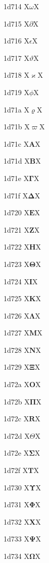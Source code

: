 \documentclass[11pt]{article}
\begin{document}
1d714 X{\ensuremath{\mathit{\omega}}}X

1d715 X{\ensuremath{\mathit{\partial}}}X

1d716 X{\ensuremath{\mathit{\epsilon}}}X

1d717 X{\ensuremath{\mathit{\vartheta}}}X

1d718 X{\ensuremath{\mathit{\varkappa}}}X

1d719 X{\ensuremath{\mathit{\phi}}}X

1d71a X{\ensuremath{\mathit{\varrho}}}X

1d71b X{\ensuremath{\mathit{\varpi}}}X

1d71c X{\ensuremath{\boldsymbol{A}}}X

1d71d X{\ensuremath{\boldsymbol{B}}}X

1d71e X{\ensuremath{\boldsymbol{\Gamma}}}X

1d71f X{\ensuremath{\boldsymbol{\Delta}}}X

1d720 X{\ensuremath{\boldsymbol{E}}}X

1d721 X{\ensuremath{\boldsymbol{Z}}}X

1d722 X{\ensuremath{\boldsymbol{H}}}X

1d723 X{\ensuremath{\boldsymbol{\Theta}}}X

1d724 X{\ensuremath{\boldsymbol{I}}}X

1d725 X{\ensuremath{\boldsymbol{K}}}X

1d726 X{\ensuremath{\boldsymbol{\Lambda}}}X

1d727 X{\ensuremath{\boldsymbol{M}}}X

1d728 X{\ensuremath{\boldsymbol{N}}}X

1d729 X{\ensuremath{\boldsymbol{\Xi}}}X

1d72a X{\ensuremath{\boldsymbol{O}}}X

1d72b X{\ensuremath{\boldsymbol{\Pi}}}X

1d72c X{\ensuremath{\boldsymbol{R}}}X

1d72d X{\ensuremath{\boldsymbol{\varTheta}}}X

1d72e X{\ensuremath{\boldsymbol{\Sigma}}}X

1d72f X{\ensuremath{\boldsymbol{T}}}X

1d730 X{\ensuremath{\boldsymbol{\Upsilon}}}X

1d731 X{\ensuremath{\boldsymbol{\Phi}}}X

1d732 X{\ensuremath{\boldsymbol{X}}}X

1d733 X{\ensuremath{\boldsymbol{\Psi}}}X

1d734 X{\ensuremath{\boldsymbol{\Omega}}}X
\end{document}
